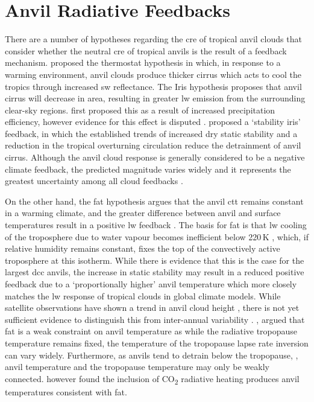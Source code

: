 \section{Anvil Radiative Feedbacks} \label{sec:anvil_feedbacks}

There are a number of hypotheses regarding the \acrshort{cre} of tropical anvil clouds that consider whether the neutral \acrshort{cre} of tropical anvils is the result of a feedback mechanism. 
\citet{ramanathan_cloud-radiative_1989} proposed the thermostat hypothesis in which, in response to a warming environment, anvil clouds produce thicker cirrus which acts to cool the tropics through increased \acrshort{sw} reflectance. 
The Iris hypothesis proposes that anvil cirrus will decrease in area, resulting in greater \acrshort{lw} emission from the surrounding clear-sky regions.
\citet{lindzen_does_2001} first proposed this as a result of increased precipitation efficiency, however evidence for this effect is disputed \citep{genio_climatic_2002, lin_examination_2004}.
\citet{bony_thermodynamic_2016} proposed a `stability iris' feedback, in which the established trends of increased dry static stability \citep{held_robust_2006} and a reduction in the tropical overturning circulation \citep{vecchi_global_2007} reduce the detrainment of anvil cirrus.
Although the anvil cloud response is generally considered to be a negative climate feedback, the predicted magnitude varies widely and it represents the greatest uncertainty among all cloud feedbacks \citep{sherwood_assessment_2020}.

On the other hand, the \acrfull{fat} hypothesis argues that the anvil \acrfull{ctt} remains constant in a warming climate, and the greater difference between anvil and surface temperatures result in a positive \acrshort{lw} feedback \citep{hartmann_important_2002}.
The basis for \acrfull{fat} is that \acrshort{lw} cooling of the troposphere due to water vapour becomes inefficient below 220\,\unit{K} \citep{jeevanjee_simple_2020}, which, if relative humidity remains constant, fixes the top of the convectively active troposphere at this isotherm. 
While there is evidence that this is the case for the largest \acrshort{dcc} anvils, the increase in static stability may result in a reduced positive feedback due to a `proportionally higher' anvil temperature \citep{zelinka_why_2010} which more closely matches the \acrshort{lw} response of tropical clouds in global climate models.
While satellite observations have shown a trend in anvil cloud height \citep{norris_evidence_2016}, there is not yet sufficient evidence to distinguish this from inter-annual variability \citep{takahashi_when_2019}.
\citet{seeley_fat_2019}, argued that \acrshort{fat} is a weak constraint on anvil temperature as while the radiative tropopause temperature remains fixed, the temperature of the tropopause lapse rate inversion can vary widely. 
Furthermore, as anvils tend to detrain below the tropopause, \citep{takahashi_level_2017, wang_observational_2020}, anvil temperature and the tropopause temperature may only be weakly connected.
\citet{seidel_temperatures_2022} however found the inclusion of CO\textsubscript{2} radiative heating produces anvil temperatures consistent with \acrshort{fat}.

